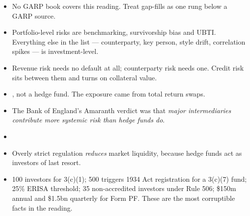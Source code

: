 \begin{imtrapbox}[title={Consolidated trap summary --- IM-9}]
\begin{itemize}
\item {} No GARP book covers this reading. Treat gap-fills as one rung
below a GARP source.
\item {} Portfolio-level risks are benchmarking,
survivorship bias and UBTI. Everything else in the list --- counterparty, key
person, style drift, correlation spikes --- is investment-level.
\item {} Revenue risk needs no default at all; counterparty risk
needs one. Credit risk sits between them and turns on collateral value.
\item {} , not a hedge
fund. The exposure came from total return swaps.
\item {} The Bank of England's Amaranth verdict was that
\emph{major intermediaries contribute more systemic risk than hedge funds do}.
\item {} 
\item {} Overly strict regulation \emph{reduces} market
liquidity, because hedge funds act as investors of last resort.
\item {} 100 investors for 3(c)(1); 500 triggers 1934 Act
registration for a 3(c)(7) fund; 25\% ERISA threshold; 35 non-accredited investors
under Rule 506; \$150m annual and \$1.5bn quarterly for Form PF. These are the
most corruptible facts in the reading.
\end{itemize}
\end{imtrapbox}

